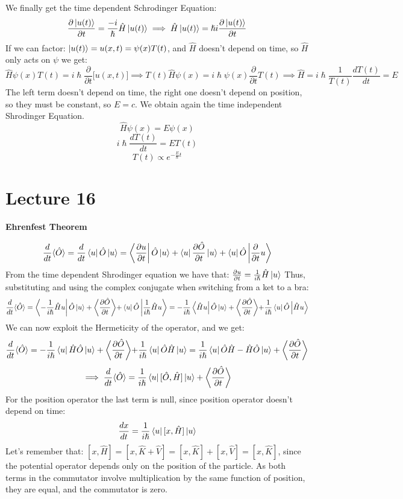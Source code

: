 \documentclass{article}
\begin{document}
We finally get the time dependent Schrodinger Equation:
$$\frac{ \partial \ket{u(t)}}{\partial t} = \frac{-i}{\hslash}\hat{H}\ket{u(t)} \implies \hat{H} \ket{u(t)} = \hslash i \frac{\partial \ket{u(t)}}{\partial t} $$
If we can factor: $ \ket{u(t)} = u(x,t) = \psi(x) T(t)$, and $\hat{H}$ doesn't depend on time, so $\hat{H}$ only acts on $\psi$  we get:
$$\hat{H}\psi(x) T(t) = i \hslash \frac{\partial}{\partial t} \bigl[ u(x,t) \bigl] \implies T(t) \hat{H}\psi(x) = i \hslash \psi(x) \frac{\partial}{\partial t} T(t) \implies \hat{H} = i \hslash \frac{1}{T(t)} \frac{d T(t)}{dt} = E$$
The left term doesn't depend on time, the right one doesn't depend on position, so they must be constant, so $E=c$.
We obtain again the time independent Shrodinger Equation.
$$\hat{H}\psi(x) = E \psi(x)$$
$$i \hslash \frac{dT(t)}{dt} = E T(t)$$
$$T(t) \varpropto e^{-\frac{E}{\hslash}t}$$

\section{Lecture 16}
\textbf{Ehrenfest Theorem}

$$\frac{d}{dt} \langle \hat{O} \rangle = \frac{d}{dt} \bra{u} \hat{O} \ket{u} = \bra{\frac{\partial u}{\partial t}} \hat{O} \ket{u} + \bra{u} \frac{\partial \hat{O}}{\partial t} \ket{u} + \bra{u} \hat{O} \ket{\frac{\partial }{\partial t}u}$$
From the time dependent Shrodinger equation we have that: $\frac{\partial u}{\partial t} = \frac{1}{i\hslash} \hat{H}\ket{u} $
Thus, substituting and using the complex conjugate when switching from a ket to a bra:
$$\frac{d}{dt} \langle \hat{O} \rangle = \bra{-\frac{1}{i\hslash} \hat{H} u} \hat{O} \ket{u} + \biggl\langle \frac{\partial \hat{O}}{\partial t} \biggl\rangle + \bra{u} \hat{O} \ket{\frac{1}{i\hslash} \hat{H} u}  = -\frac{1}{i\hslash}  \bra{\hat{H} u} \hat{O} \ket{u} + \biggl\langle \frac{\partial \hat{O}}{\partial t} \biggl\rangle + \frac{1}{i\hslash} \bra{u} \hat{O}  \ket{\hat{H} u} 
$$
We can now exploit the Hermeticity of the operator, and we get:
$$\frac{d}{dt} \langle \hat{O} \rangle = -\frac{1}{i\hslash}  \bra{ u} \hat{H}\hat{O} \ket{u} + \biggl\langle \frac{\partial \hat{O}}{\partial t} \biggl\rangle + \frac{1}{i\hslash} \bra{u} \hat{O} \hat{H} \ket{u} = \frac{1}{i\hslash} \bra{u} \hat{O}\hat{H}- \hat{H}\hat{O} \ket{u} + \biggl\langle \frac{\partial \hat{O}}{\partial t} \biggl\rangle $$
$$ \implies \frac{d}{dt} \langle \hat{O} \rangle = \frac{1}{i\hslash}\bra{u}[\hat{O}, \hat{H}] \ket{u} +  \biggl\langle \frac{\partial \hat{O}}{\partial t} \biggl\rangle $$
For the position operator the last term is null, since position operator doesn't depend on time:
$$\frac{dx}{dt} =  \frac{1}{i\hslash}\bra{u}[x, \hat{H}] \ket{u}$$
Let's remember that:
$[x,\hat{H}] = [x, \hat{K}+ \hat{V}] = [x,\hat{K}]+ [x, \hat{V}] = [x,\hat{K}] $, since  the potential operator depends only on the position of the particle. As both terms in the commutator involve multiplication by the same function of position, they are equal, and the commutator is zero.
\end{document}
